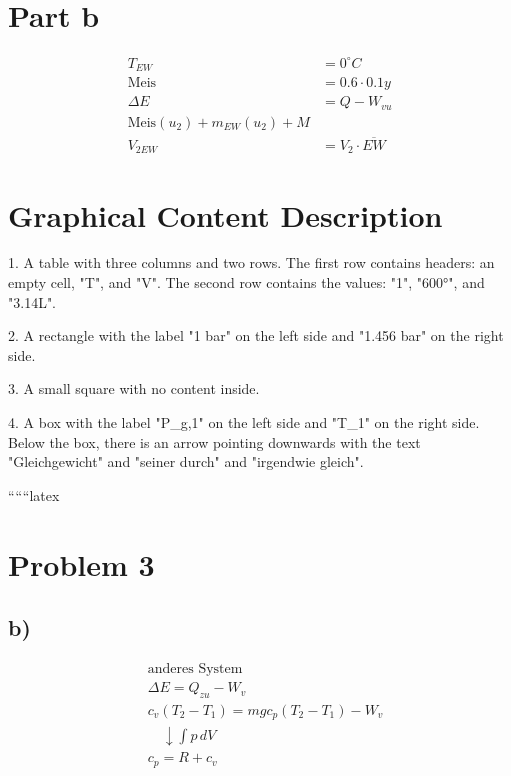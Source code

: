 \section*{Part b}

\[
\begin{aligned}
    T_{EW} &= 0^\circ C \\
    \text{Meis} &= 0.6 \cdot 0.1 y \\
    \Delta E &= Q - W_{vu} \\
    \text{Meis}(u_2) + m_{EW}(u_2) + M \\
    V_{2EW} &= V_{2} \cdot \overline{EW}
\end{aligned}
\]

\section*{Graphical Content Description}

1. A table with three columns and two rows. The first row contains headers: an empty cell, "T", and "V". The second row contains the values: "1", "600°", and "3.14L".

2. A rectangle with the label "1 bar" on the left side and "1.456 bar" on the right side.

3. A small square with no content inside.

4. A box with the label "P_{g,1}" on the left side and "T_{1}" on the right side. Below the box, there is an arrow pointing downwards with the text "Gleichgewicht" and "seiner durch" and "irgendwie gleich".

``````latex


\section*{Problem 3}



\subsection*{b)}

\[
\begin{aligned}
    &\text{anderes System} \\
    &\Delta E = Q_{zu} - W_v \\
    &c_v (T_2 - T_1) = m g c_p (T_2 - T_1) - W_v \\
    &\quad \downarrow \int p \, dV \\
    &c_p = R + c_v
\end{aligned}
\]